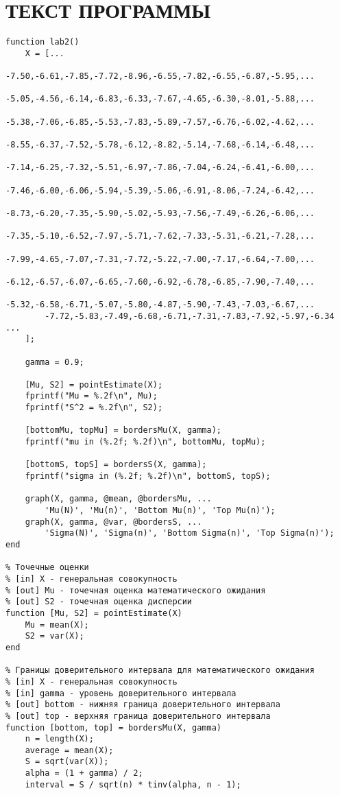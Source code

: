 \section{ТЕКСТ ПРОГРАММЫ}

\begin{lstlisting}[caption=Текст программы]
function lab2()
    X = [...
        -7.50,-6.61,-7.85,-7.72,-8.96,-6.55,-7.82,-6.55,-6.87,-5.95,...
        -5.05,-4.56,-6.14,-6.83,-6.33,-7.67,-4.65,-6.30,-8.01,-5.88,...
        -5.38,-7.06,-6.85,-5.53,-7.83,-5.89,-7.57,-6.76,-6.02,-4.62,...
        -8.55,-6.37,-7.52,-5.78,-6.12,-8.82,-5.14,-7.68,-6.14,-6.48,...
        -7.14,-6.25,-7.32,-5.51,-6.97,-7.86,-7.04,-6.24,-6.41,-6.00,...
        -7.46,-6.00,-6.06,-5.94,-5.39,-5.06,-6.91,-8.06,-7.24,-6.42,...
        -8.73,-6.20,-7.35,-5.90,-5.02,-5.93,-7.56,-7.49,-6.26,-6.06,...
        -7.35,-5.10,-6.52,-7.97,-5.71,-7.62,-7.33,-5.31,-6.21,-7.28,...
        -7.99,-4.65,-7.07,-7.31,-7.72,-5.22,-7.00,-7.17,-6.64,-7.00,...
        -6.12,-6.57,-6.07,-6.65,-7.60,-6.92,-6.78,-6.85,-7.90,-7.40,...
        -5.32,-6.58,-6.71,-5.07,-5.80,-4.87,-5.90,-7.43,-7.03,-6.67,...
        -7.72,-5.83,-7.49,-6.68,-6.71,-7.31,-7.83,-7.92,-5.97,-6.34 ...
    ];

    gamma = 0.9;

    [Mu, S2] = pointEstimate(X);
    fprintf("Mu = %.2f\n", Mu);
    fprintf("S^2 = %.2f\n", S2);

    [bottomMu, topMu] = bordersMu(X, gamma);
    fprintf("mu in (%.2f; %.2f)\n", bottomMu, topMu);

    [bottomS, topS] = bordersS(X, gamma);
    fprintf("sigma in (%.2f; %.2f)\n", bottomS, topS);

    graph(X, gamma, @mean, @bordersMu, ...
        'Mu(N)', 'Mu(n)', 'Bottom Mu(n)', 'Top Mu(n)');
    graph(X, gamma, @var, @bordersS, ...
        'Sigma(N)', 'Sigma(n)', 'Bottom Sigma(n)', 'Top Sigma(n)');
end

% Точечные оценки
% [in] X - генеральная совокупность
% [out] Mu - точечная оценка математического ожидания
% [out] S2 - точечная оценка дисперсии
function [Mu, S2] = pointEstimate(X)
    Mu = mean(X);
    S2 = var(X);
end

% Границы доверительного интервала для математического ожидания
% [in] X - генеральная совокупность
% [in] gamma - уровень доверительного интервала
% [out] bottom - нижняя граница доверительного интервала
% [out] top - верхняя граница доверительного интервала
function [bottom, top] = bordersMu(X, gamma)
    n = length(X);
    average = mean(X);
    S = sqrt(var(X));
    alpha = (1 + gamma) / 2;
    interval = S / sqrt(n) * tinv(alpha, n - 1);


\end{lstlisting}

